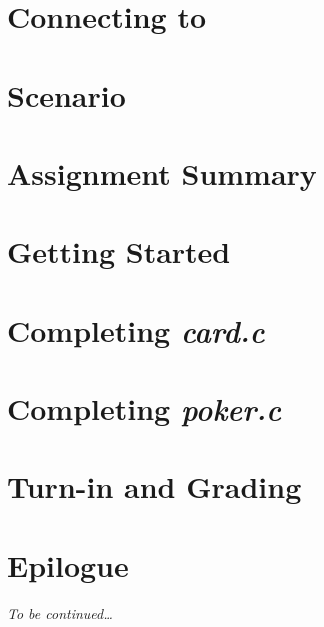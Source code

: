 \documentclass[12pt]{article}
\begin{document}
    \labidentifier


    \section{Connecting to \runtimeenvironment} \label{sec:connecting}  

    \softwareengineeringfrontmatter

    \section*{Scenario}                                                 \scenariointroduction

    \section{Assignment Summary}                                        

    \section{Getting Started} \label{sec:gettingstarted}                

    \section{Completing \textit{card.c}} \label{sec:completingcard}     

    \section{Completing \textit{poker.c}} \label{sec:completingpoker}   

    \section{Turn-in and Grading}                                       

    \section*{Epilogue}                                                 \scenariowrapup

    \textit{To be continued\dots}
\end{document}
